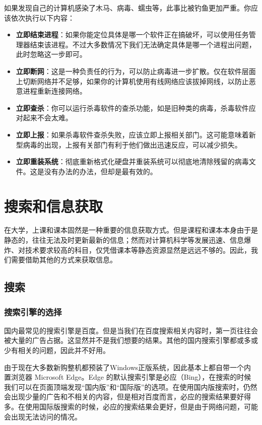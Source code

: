 \documentclass[12pt]{report}
\begin{document}
如果发现自己的计算机感染了木马、病毒、蠕虫等，此事比被钓鱼更加严重。你应该依次执行以下内容：

\begin{itemize}
    \item \textbf{立即结束进程}：如果你能定位具体是哪一个软件正在搞破坏，可以使用任务管理器结束该进程。不过大多数情况下我们无法确定具体是哪一个进程出问题，此时忽略这一步即可。
    \item \textbf{立即断网}：这是一种负责任的行为，可以防止病毒进一步扩散。仅在软件层面上切断网络并不足够，如果你的计算机使用有线网络应该拔掉网线，以防止恶意进程重新连接网络。
    \item \textbf{立即查杀}：你可以运行杀毒软件的查杀功能，如是旧种类的病毒，杀毒软件应对起来不会太难。
    \item \textbf{立即上报}：如果杀毒软件查杀失败，应该立即上报相关部门。这可能意味着新型病毒的出现，上报有关部门有利于他们做出迅速反应，可以减少损失。
    \item \textbf{立即重装系统}：彻底重新格式化硬盘并重装系统可以彻底地清除残留的病毒文件。这是没有办法的办法，但却是最有效的。
\end{itemize}

\chapter{搜索和信息获取} %

在大学，上课和课本固然是一种重要的信息获取方式。但是课程和课本本身由于是静态的，往往无法及时更新最新的信息；然而对计算机科学等发展迅速、信息爆炸、对技术要求较高的科目，仅凭借课本等静态资源显然是远远不够的。因此，我们需要借助其他的方式来获取信息。

\section{搜索}

\subsection{搜索引擎的选择}

国内最常见的搜索引擎是百度。但是当我们在百度搜索相关内容时，第一页往往会被大量的广告占据。这显然并不是我们想要的结果。其他的国内搜索引擎都或多或少有相关的问题，因此并不好用。

由于现在大多数新购整机都预装了Windows正版系统，因此基本上都自带一个内置浏览器 Microsoft Edge。Edge 的默认搜索引擎是必应（Bing），在搜索的时候我们可以在页面顶端发现“国内版”和“国际版”的选项。在使用国内版搜索时，仍然会出现少量的广告和不相关的内容，但是相对百度而言，必应的搜索结果要好得多。在使用国际版搜索的时候，必应的搜索结果会更好，但是由于网络问题，可能会出现无法访问的情况。
\end{document}
